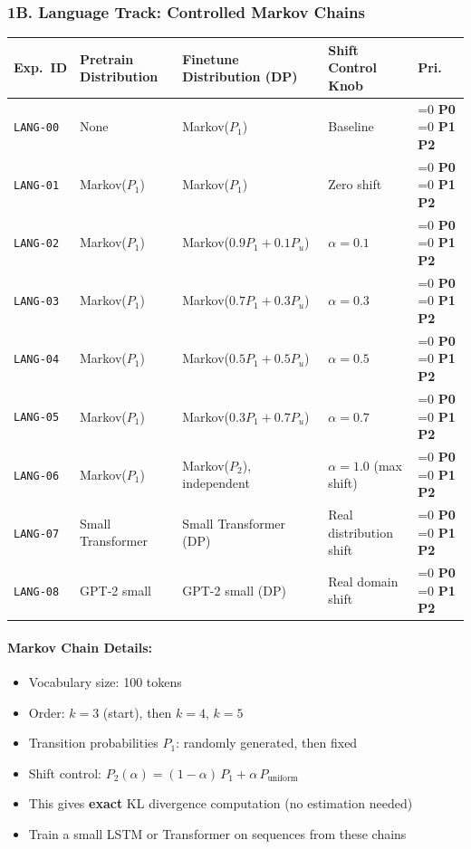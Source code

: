 \documentclass[11pt,a4paper]{article}
\newcommand{\ptag}[1]{%
    \ifnum\pdfstrcmp{#1}{P0}=0
        {\textcolor{p0color}{\textbf{P0}}}%
    \else\ifnum\pdfstrcmp{#1}{P1}=0
        {\textcolor{p1color}{\textbf{P1}}}%
    \else
        {\textcolor{p2color}{\textbf{P2}}}%
    \fi\fi
}
\begin{document}
\subsubsection{1B. Language Track: Controlled Markov Chains}

\begin{small}
\begin{longtable}{@{}p{1.2cm}p{2.8cm}p{3.5cm}p{2.5cm}p{0.6cm}@{}}
\toprule
\textbf{Exp.\ ID} & \textbf{Pretrain Distribution} & \textbf{Finetune Distribution (DP)} & \textbf{Shift Control Knob} & \textbf{Pri.} \\
\midrule
\endhead
\texttt{LANG-00} & None & Markov($P_1$) & Baseline & \ptag{P0} \\
\texttt{LANG-01} & Markov($P_1$) & Markov($P_1$) & Zero shift & \ptag{P0} \\
\texttt{LANG-02} & Markov($P_1$) & Markov($0.9 P_1 + 0.1 P_u$) & $\alpha=0.1$ & \ptag{P0} \\
\texttt{LANG-03} & Markov($P_1$) & Markov($0.7 P_1 + 0.3 P_u$) & $\alpha=0.3$ & \ptag{P0} \\
\texttt{LANG-04} & Markov($P_1$) & Markov($0.5 P_1 + 0.5 P_u$) & $\alpha=0.5$ & \ptag{P0} \\
\texttt{LANG-05} & Markov($P_1$) & Markov($0.3 P_1 + 0.7 P_u$) & $\alpha=0.7$ & \ptag{P0} \\
\texttt{LANG-06} & Markov($P_1$) & Markov($P_2$), independent & $\alpha=1.0$ (max shift) & \ptag{P0} \\
\texttt{LANG-07} & Small Transformer & Small Transformer (DP) & Real distribution shift & \ptag{P1} \\
\texttt{LANG-08} & GPT-2 small & GPT-2 small (DP) & Real domain shift & \ptag{P2} \\
\bottomrule
\end{longtable}
\end{small}

\paragraph{Markov Chain Details:}
\begin{itemize}[nosep]
    \item Vocabulary size: 100 tokens
    \item Order: $k=3$ (start), then $k=4$, $k=5$
    \item Transition probabilities $P_1$: randomly generated, then fixed
    \item Shift control: $P_2(\alpha) = (1-\alpha)\,P_1 + \alpha\,P_{\text{uniform}}$
    \item This gives \textbf{exact} KL divergence computation (no estimation needed)
    \item Train a small LSTM or Transformer on sequences from these chains
\end{itemize}
\end{document}
